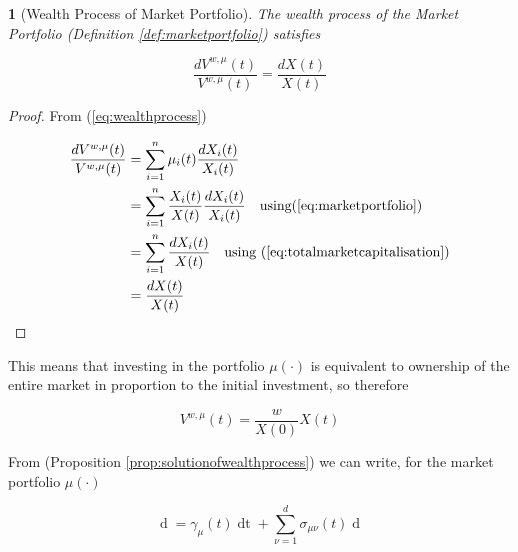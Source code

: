 \documentclass[british]{amsart}
\numberwithin{equation}{section}
\numberwithin{figure}{section}
\theoremstyle{plain}
\newtheorem{thm}{\protect\theoremname}[section]
\theoremstyle{definition}
\theoremstyle{plain}
\theoremstyle{plain}
\theoremstyle{plain}
\theoremstyle{remark}
\theoremstyle{plain}
\providecommand{\theoremname}{Theorem}
\renewcommand{\d}[1]{\mathop{\mathrm{d}{#1}}}
\begin{document}
\begin{thm} [Wealth Process of Market Portfolio]

	The wealth process of the Market Portfolio (Definition \ref{def:marketportfolio}) satisfies

	\begin{equation}
		\label{eq:wealthprocessofmarketportfolio}
			\frac{d{V^{w,\mu}(t)}}{V^{w,\mu}(t)} = \frac{d{X(t)}}{X(t)}  
	\end{equation}

\end{thm}

\begin{proof}

	From (\ref{eq:wealthprocess})

	\begin{gather}
		\begin{split}
			\frac{d{V^{w,\mu}(t)}}{V^{w,\mu}(t)} 
				& = \sum_{i=1}^{n} \mu_{i}(t) \frac{d{X_{i}(t)}}{X_{i}(t)} \\ 
				& = \sum_{i=1}^{n} \frac{X_{i}(t)}{X(t)} \frac{d{X_{i}(t)}}{X_{i}(t)} 
					\quad \text{using} (\ref{eq:marketportfolio}) \\ 
				& = \sum_{i=1}^{n} \frac{d{X_{i}(t)}}{X(t)} 
					\quad \text{using } (\ref{eq:totalmarketcapitalisation}) \\ 
				& = \frac{d{X(t)}}{X(t)}  
		\end{split}
	\end{gather}

\end{proof}

This means that investing in the portfolio $\mu(\cdot)$ is equivalent to ownership of
the entire market in proportion to the initial investment, so therefore

\begin{equation}
		V^{w,\mu}(t) = \frac{w}{X(0)}X(t)	
\end{equation}

From (Proposition \ref{prop:solutionofwealthprocess}) we can write, for the market portfolio
$\mu(\cdot)$

\begin{equation}
	\d{V^{w,\mu}(t)} =  
			\gamma_{\mu}(t) \d{t} +
			\sum_{\nu=1}^{d} \sigma_{\mu\nu}(t) \d{W_{\nu}(t)}
\end{equation}
\end{document}

